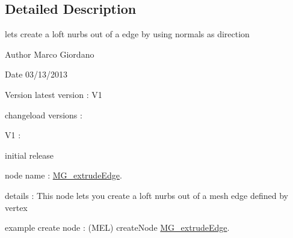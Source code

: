 \subsection{Detailed Description}
lets create a loft nurbs out of a edge by using normals as direction 

\begin{DoxyAuthor}{Author}
Marco Giordano 
\end{DoxyAuthor}
\begin{DoxyDate}{Date}
03/13/2013 
\end{DoxyDate}
\begin{DoxyVersion}{Version}
latest version \-: V1 

changeload versions \-: \par
 V1 \-: \par

\begin{DoxyItemize}
\item initial release \par

\end{DoxyItemize}
\end{DoxyVersion}
node name \-: \hyperlink{class_m_g__extrude_edge}{M\-G\-\_\-extrude\-Edge}.

details \-: This node lets you create a loft nurbs out of a mesh edge defined by vertex

example create node \-: (M\-E\-L) create\-Node \hyperlink{class_m_g__extrude_edge}{M\-G\-\_\-extrude\-Edge}. 

